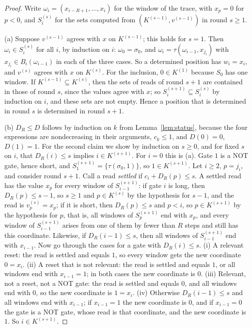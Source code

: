 \documentclass[11pt]{amsart}
\theoremstyle{definition}
\theoremstyle{remark}
\begin{document}
\begin{proof}
Write $\omega_i=(x_{i-R+1},\dots,x_i)$ for the window of the trace, with $x_p=0$ for $p<0$, and
$S^{(s)}_i$ for the sets computed from $(K^{(s-1)},v^{(s-1)})$ in round $s\ge1$.

(a) Suppose $v^{(s-1)}$ agrees with $x$ on $K^{(s-1)}$; this holds for $s=1$. Then
$\omega_i\in S^{(s)}_i$ for all $i$, by induction on $i$: $\omega_0=\sigma_0$, and
$\omega_i=\tau(\omega_{i-1},x_{j_i})$ with $x_{j_i}\in B_i(\omega_{i-1})$ in each of the three
cases. So a determined position has $w_i=x_i$, and $v^{(s)}$ agrees with $x$ on $K^{(s)}$.
For the inclusion, $0\in K^{(1)}$ because $S_0$ has one window. If $K^{(s-1)}\subseteq K^{(s)}$,
then the sets of reads of round $s+1$ are contained in those of round $s$, since the values agree
with $x$; so $S^{(s+1)}_i\subseteq S^{(s)}_i$ by induction on $i$, and these sets are not empty.
Hence a position that is determined in round $s$ is determined in round $s+1$.

(b) $D_R\le D$ follows by induction on $k$ from Lemma~\ref{lem:status}, because the four
expressions are nondecreasing in their arguments, $c_k\le1$, and $D(0)=0$, $D(1)=1$. For the
second claim we show by induction on $s\ge0$, and for fixed $s$ on $i$, that $D_R(i)\le s$
implies $i\in K^{(s+1)}$. For $i=0$ this is (a). Gate $1$ is a NOT gate, hence short, and
$S^{(s+1)}_1=\{\tau(\sigma_0,1)\}$, so $1\in K^{(s+1)}$. Let $i\ge2$, $p=j_i$, and consider round
$s+1$. Call a read \emph{settled} if $c_i+D_R(p)\le s$. A settled read has the value $x_p$ for
every window of $S^{(s+1)}_{i-1}$: if gate $i$ is long, then $D_R(p)\le s-1$, so $s\ge1$ and
$p\in K^{(s)}$ by the hypothesis for $s-1$, and the read is $v^{(s)}_p=x_p$; if it is short, then
$D_R(p)\le s$ and $p<i$, so $p\in K^{(s+1)}$ by the hypothesis for $p$, that is, all windows of
$S^{(s+1)}_p$ end with $x_p$, and every window of $S^{(s+1)}_{i-1}$ arises from one of them by
fewer than $R$ steps and still has this coordinate. Likewise, if $D_R(i-1)\le s$, then all
windows of $S^{(s+1)}_{i-1}$ end with $x_{i-1}$. Now go through the cases for a gate with
$D_R(i)\le s$. (i) A relevant reset: the read is settled and equals $1$, so every window gets the
new coordinate $0=x_i$. (ii) A reset that is not relevant: the read is settled and equals $1$, or
all windows end with $x_{i-1}=1$; in both cases the new coordinate is $0$. (iii) Relevant, not a
reset, not a NOT gate: the read is settled and equals $0$, and all windows end with $0$, so the
new coordinate is $1=x_i$. (iv) Otherwise $D_R(i-1)\le s$ and all windows end with $x_{i-1}$; if
$x_{i-1}=1$ the new coordinate is $0$, and if $x_{i-1}=0$ the gate is a NOT gate, whose read is
that coordinate, and the new coordinate is $1$. So $i\in K^{(s+1)}$.


\end{proof}
\end{document}
